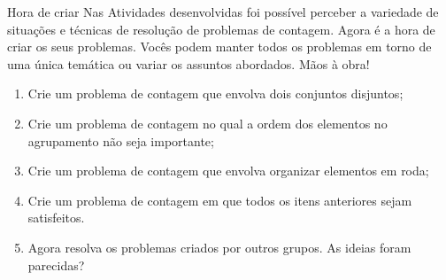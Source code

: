 
\begin{task}{Hora de criar}
Nas Atividades desenvolvidas foi possível perceber a variedade de situações e técnicas de resolução de problemas de contagem. Agora é a hora de criar os seus problemas. Vocês podem manter todos os problemas em torno de uma única temática ou variar os assuntos abordados. Mãos à obra!

\begin{enumerate}

    \item Crie um problema de contagem que envolva dois conjuntos disjuntos; 
    \item Crie um problema de contagem no qual a ordem dos elementos no agrupamento não seja importante;
    \item Crie um problema de contagem que envolva organizar elementos em roda;
    \item Crie um problema de contagem em que todos os itens anteriores sejam satisfeitos. 
    \item Agora resolva os problemas criados por outros grupos. As ideias foram parecidas?
    
\end{enumerate}
\end{task}

